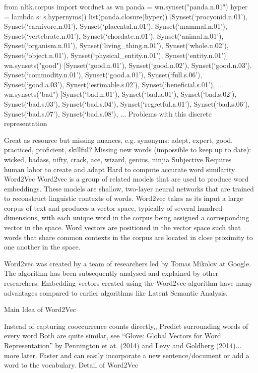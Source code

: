 from nltk.corpus import wordnet as wn
panda = wn.synset("panda.n.01")
hyper = lambda s: s.hypernyms()
list(panda.closure(hyper))
[Synset(‘procyonid.n.01’),
Synset(‘carnivore.n.01’),
Synset(‘placental.n.01’),
Synset(‘mammal.n.01’),
Synset(‘vertebrate.n.01’),
Synset(‘chordate.n.01’),
Synset(‘animal.n.01’),
Synset(‘organism.n.01’),
Synset(‘living_thing.n.01’),
Synset(‘whole.n.02’),
Synset(‘object.n.01’),
Synset(‘physical_entity.n.01’),
Synset(‘entity.n.01’)]
wn.synsets("good")
[Synset(‘good.n.01’),
Synset(‘good.n.02’),
Synset(‘good.n.03’),
Synset(‘commodity.n.01’),
Synset(‘good.a.01’),
Synset(‘full.s.06’),
Synset(‘good.a.03’),
Synset(‘estimable.s.02’),
Synset(‘beneficial.s.01’),
...
wn.synsets("bad")
[Synset(‘bad.n.01’),
Synset(‘bad.a.01’),
Synset(‘bad.s.02’),
Synset(‘bad.s.03’),
Synset(‘bad.s.04’),
Synset(‘regretful.a.01’),
Synset(‘bad.s.06’),
Synset(‘bad.s.07’),
Synset(‘bad.s.08’),
...
Problems with this discrete representation

Great as resource but missing nuances, e.g. synonyms: adept, expert, good, practiced, proficient, skillful?
Missing new words (impossible to keep up to date): wicked, badass, nifty, crack, ace, wizard, genius, ninjia
Subjective
Requires human labor to create and adapt
Hard to compute accurate word similarity
Word2Vec
Word2vec is a group of related models that are used to produce word embeddings. These models are shallow, two-layer neural networks that are trained to reconstruct linguistic contexts of words. Word2vec takes as its input a large corpus of text and produces a vector space, typically of several hundred dimensions, with each unique word in the corpus being assigned a corresponding vector in the space. Word vectors are positioned in the vector space such that words that share common contexts in the corpus are located in close proximity to one another in the space.

Word2vec was created by a team of researchers led by Tomas Mikolov at Google. The algorithm has been subsequently analysed and explained by other researchers. Embedding vectors created using the Word2vec algorithm have many advantages compared to earlier algorithms like Latent Semantic Analysis.

Main Idea of Word2Vec

Instead of capturing cooccurrence counts directly,,
Predict surrounding words of every word
Both are quite similar, see “Glove: Global Vectors for Word Representation” by Pennington et at. (2014) and Levy and Goldberg (2014)... more later.
Faster and can easily incorporate a new sentence/document or add a word to the vocabulary.
Detail of Word2Vec

